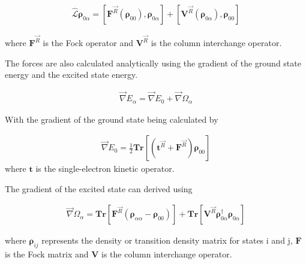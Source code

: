\begin{align*}
  \hat{\mathbf{\mathcal{L}}}\mathbf{\rho}_{0\alpha} = \left[ \mathbf{F}^{\vec{R}}(\mathbf{\rho}_{00}), \mathbf{\rho}_{0\alpha} \right]
  + \left[ \mathbf{V}^{\vec{R}}(\mathbf{\rho}_{0\alpha}), \mathbf{\rho}_{00} \right]
\end{align*}

where \(\textbf{F}^{\vec{R}}\) is the Fock operator and \(\textbf{V}^{\vec{R}}\) is the column interchange operator.

The forces are also calculated analytically using the gradient of the ground state
energy and the excited state energy.

\begin{align*}
  \vec{\nabla} E_{\alpha} = \vec{\nabla} E_0 + \vec{\nabla} \Omega_{\alpha}
\end{align*}

With the gradient of the ground state being calculated by

\begin{align*}
  \vec{\nabla} E_0 = \frac{1}{2}\mathbf{Tr} \left[ \left( \mathbf{t}^{\vec{R}} + \mathbf{F}^{\vec{R}} \right) \mathbf{\rho}_{00} \right]
\end{align*}
where \(\textbf{t}\) is the single-electron kinetic operator.

The gradient of the excited state can derived using

\begin{align*}
  \vec{\nabla}\Omega_{\alpha} = \mathbf{Tr} \left[ \mathbf{F}^{\vec{R}} (\mathbf{\rho}_{\alpha\alpha} - \mathbf{\rho}_{00})\right]
  + \mathbf{Tr} \left[\mathbf{V}^{\vec{R}}\mathbf{\rho}_{0\alpha}^\dagger \mathbf{\rho}_{0\alpha} \right]
\end{align*}

where \(\mathbf{\rho}_{ij}\) represents the density or transition density matrix for states i and
j, \(\mathbf{F}\) is the Fock matrix and \(\mathbf{V}\) is the column interchange operator.

